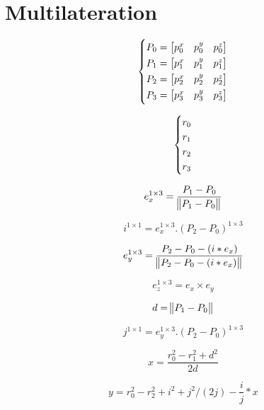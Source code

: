 \documentclass[./main.tex]{subfiles}
\begin{document}
\chapter{Multilateration}

\begin{equation}
    \begin{dcases*}
        P_0 = 
        \begin{bmatrix}
            p_0^x & p_0^y & p_0^z
        \end{bmatrix} \\
        P_1 = 
        \begin{bmatrix}
            p_1^x & p_1^y & p_1^z
        \end{bmatrix} \\
        P_2 = 
        \begin{bmatrix}
            p_2^x & p_2^y & p_2^z
        \end{bmatrix} \\
        P_3 = 
        \begin{bmatrix}
            p_3^x & p_3^y & p_3^z
        \end{bmatrix}
    \end{dcases*}
    \label{eqn:anchor_location}
\end{equation}

\begin{equation}
    \begin{dcases*}
        r_0 \\ r_1 \\ r_2 \\ r_3
    \end{dcases*}
    \label{eqn:anchor_location}
\end{equation}

\begin{equation}
    e_x^{1\times3} = \frac{P_1 - P_0}{\norm[1]{P_1 - P_0}}
\end{equation}

\begin{equation}
    i^{1\times1} = e_x^{1\times3}.(P_2 - P_0)^{1\times3}
\end{equation}

\begin{equation}
    e_y^{1\times3} = \frac{P_2-P_0-(i*e_x)}{\norm[1]{P_2-P_0-(i*e_x)}}
\end{equation}

\begin{equation}
    e_z^{1\times3} = e_x \times e_y
\end{equation}

\begin{equation}
    d = \norm[1]{P_1 - P_0}
\end{equation}

\begin{equation}
    j^{1\times1} = e_y^{1\times3}.(P_2 - P_0)^{1\times3}
\end{equation}

\begin{equation}
    x = \frac{r_0^2 - r_1^2 + d^2}{2d}
\end{equation}

\begin{equation}
    y = r_0^2 - r_2^2 + i^2 + j^2/(2j) - \frac{i}{j}*x
\end{equation}
\end{document}
